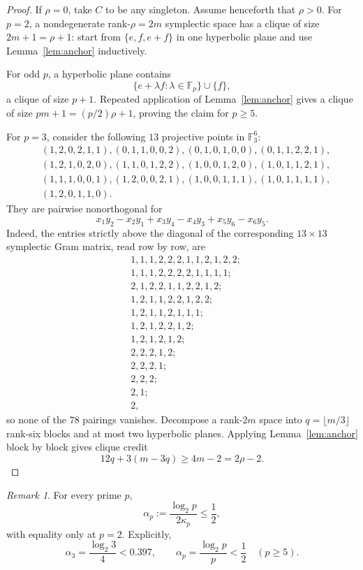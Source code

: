 \documentclass[11pt]{article}
\theoremstyle{definition}
\theoremstyle{remark}
\newtheorem{remark}[theorem]{Remark}
\newcommand{\F}{\mathbb{F}}
\begin{document}
\begin{proof}
If $\rho=0$, take $C$ to be any singleton. Assume henceforth that $\rho>0$. For $p=2$, a nondegenerate rank-$\rho=2m$ symplectic space has a clique of size $2m+1=\rho+1$: start from $\{e,f,e+f\}$ in one hyperbolic plane and use Lemma~\ref{lem:anchor} inductively.

For odd $p$, a hyperbolic plane contains
\[
\{e+\lambda f:\lambda\in\F_p\}\cup\{f\},
\]
a clique of size $p+1$. Repeated application of Lemma~\ref{lem:anchor} gives a clique of size $pm+1=(p/2)\rho+1$, proving the claim for $p\ge5$.

For $p=3$, consider the following $13$ projective points in $\F_3^6$:
\begin{align*}
&(1,2,0,2,1,1),(0,1,1,0,0,2),(0,1,0,1,0,0),(0,1,1,2,2,1),\\
&(1,2,1,0,2,0),(1,1,0,1,2,2),(1,0,0,1,2,0),(1,0,1,1,2,1),\\
&(1,1,1,0,0,1),(1,2,0,0,2,1),(1,0,0,1,1,1),(1,0,1,1,1,1),\\
&(1,2,0,1,1,0).
\end{align*}
They are pairwise nonorthogonal for
\[
x_1y_2-x_2y_1+x_3y_4-x_4y_3+x_5y_6-x_6y_5.
\]
Indeed, the entries strictly above the diagonal of the corresponding $13\times13$ symplectic Gram matrix, read row by row, are
\begin{align*}
&1,1,1,2,2,2,1,1,2,1,2,2;\\
&1,1,1,2,2,2,2,1,1,1,1;\\
&2,1,2,2,1,1,2,2,1,2;\\
&1,2,1,1,2,2,1,2,2;\\
&1,2,1,1,2,1,1,1;\\
&1,2,1,2,2,1,2;\\
&1,2,1,2,1,2;\\
&2,2,2,1,2;\\
&2,2,2,1;\\
&2,2,2;\\
&2,1;\\
&2,
\end{align*}
so none of the $78$ pairings vanishes. Decompose a rank-$2m$ space into $q=\lfloor m/3\rfloor$ rank-six blocks and at most two hyperbolic planes. Applying Lemma~\ref{lem:anchor} block by block gives clique credit
\[
12q+3(m-3q)\ge4m-2=2\rho-2.
\]
\end{proof}

\begin{remark}\label{rem:alpha}
For every prime $p$,
\[
\alpha_p:=\frac{\log_2 p}{2\kappa_p}\le\frac12,
\]
with equality only at $p=2$. Explicitly,
\[
\alpha_3=\frac{\log_2 3}{4}<0.397,\qquad \alpha_p=\frac{\log_2 p}{p}<\frac12\quad(p\ge5).
\]
\end{remark}
\end{document}
